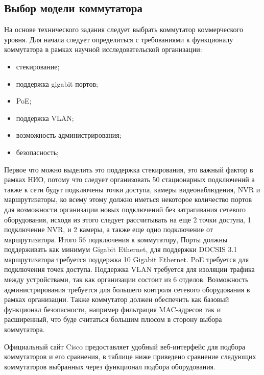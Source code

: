 \subsection{Выбор модели коммутатора}

На основе технического задания следует выбрать коммутатор коммерческого уровня. 
Для начала следует определиться с требованиями к функционалу коммутатора 
в рамках научной исследовательской организации:

\begin{itemize}
    \item стекирование;
    \item поддержка gigabit портов;
    \item PoE;    
    \item поддержка VLAN;    
    \item возможность администрирования;    
    \item безопасность;
\end{itemize}

Первое что можно выделить это поддержка стекирования, это важный фактор в рамках НИО, потому что следует организовать 50 стационарных подключений
а также к сети будут подключены точки доступа, камеры видеонаблюдения, NVR и маршрутизаторы, ко всему этому должно иметься некоторое количество портов для возможности
организации новых подключений без затрагивания сетевого оборудования, исходя из этого следует рассчитывать на еще 2 точки доступа, 1 подключение NVR, и 2 камеры, 
а также еще одно подключение от маршрутизатора. Итого 56 подключения к коммутатору,
Порты должны поддерживать как минимум Gigabit Ethernet, для поддержки DOCSIS 3.1 маршрутизатора требуется поддержка 10 Gigabit Ethernet. PoE требуется для подключения точек доступа. 
Поддержка VLAN требуется для изоляции трафика между устройствами, так как организации состоит из 6 отделов.
Возможность администрирования требуется для большего контроля сетевого оборудования в рамках организации.
Также коммутатор должен обеспечить как базовый функционал безопасности, например фильтрация MAC-адресов так и расширенный, что буде считаться большим плюсом в сторону
выбора коммутатора.

Официальный сайт Cisco предоставляет удобный веб-интерфейс для подбора коммутаторов\cite{switchsel} и его сравнения, в таблице ниже приведено сравнение следующих коммутаторов 
выбранных через функционал подбора оборудования.

